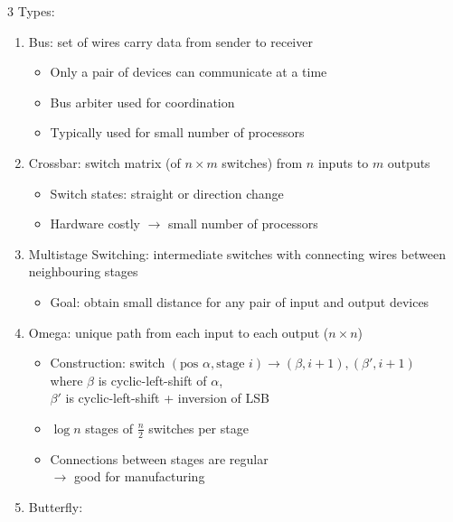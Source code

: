 \documentclass[12pt, a4paper]{article}
\begin{document}
\begin{multicols*}{3}
Types:
\begin{enumerate}[\roman*.]
  \item Bus: set of wires carry data from sender to receiver
    \begin{itemize}[leftmargin=*]\vspace{3pt}
      \item Only a pair of devices can communicate at a time 
      \item Bus arbiter used for coordination 
      \item Typically used for small number of processors
    \end{itemize}
  \item Crossbar: switch matrix (of $n\times m$ switches) from $n$ inputs to $m$ outputs
    \begin{itemize}[leftmargin=*]\vspace{3pt}
      \item Switch states: straight or direction change 
      \item Hardware costly $\rightarrow$ small number of processors
    \end{itemize}
  \item Multistage Switching: intermediate switches with connecting wires between neighbouring stages
    \begin{itemize}[leftmargin=*]\vspace{3pt}
      \item Goal: obtain small distance for any pair of input and output devices
    \end{itemize}
  \item Omega: unique path from each input to each output ($n\times n$)
    \begin{itemize}[leftmargin=*]\vspace{3pt}
      \item Construction: switch $(\text{pos }\alpha, \text{stage }i) \rightarrow (\beta,i+1), (\beta', i+1)$ \\where $\beta$ is cyclic-left-shift of $\alpha$,\\$\beta'$ is cyclic-left-shift + inversion of LSB
      \item $\log n$ stages of $\frac{n}{2}$ switches per stage
      \item Connections between stages are regular\\$\rightarrow$ good for manufacturing
    \end{itemize}
  \item Butterfly:
    \begin{itemize}[leftmargin=*]\vspace{3pt}

\end{itemize}
\end{enumerate}
\end{multicols*}
\end{document}
